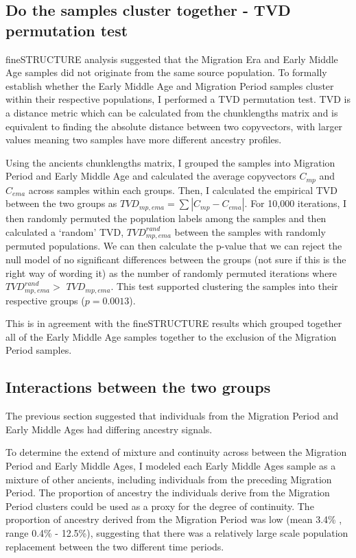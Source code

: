 \subsection{Do the samples cluster together - TVD permutation test}

fineSTRUCTURE analysis suggested that the Migration Era and Early Middle Age samples did not originate from the same source population. To formally establish whether the Early Middle Age and Migration Period samples cluster within their respective populations, I performed a TVD permutation test. TVD is a distance metric which can be calculated from the chunklengths matrix and is equivalent to finding the absolute distance between two copyvectors, with larger values meaning two samples have more different ancestry profiles.

Using the ancients chunklengths matrix, I grouped the samples into Migration Period and Early Middle Age and  calculated the average copyvectors $C_{mp}$ and $C_{ema}$ across samples within each groups. Then, I calculated the empirical TVD between the two groups as $TVD_{mp,ema} = \sum |C_{mp} - C_{ema}|$. For 10,000 iterations, I then randomly permuted the population labels among the samples and then calculated a `random' TVD, $TVD_{mp,ema}^{rand}$ between the samples with randomly permuted populations. We can then calculate the p-value that we can reject the null model of no significant differences between the groups (not sure if this is the right way of wording it) as the number of randomly permuted iterations where $TVD_{mp,ema}^{rand} > $ $TVD_{mp,ema}$. This test supported clustering the samples into their respective groups ($p=0.0013$).

This is in agreement with the fineSTRUCTURE results which grouped together all of the Early Middle Age samples together to the exclusion of the Migration Period samples. 

\subsection{Interactions between the two groups}

The previous section suggested that individuals from the Migration Period and Early Middle Ages had differing ancestry signals. 

To determine the extend of mixture and continuity across between the Migration Period and Early Middle Ages, I modeled each Early Middle Ages sample as a mixture of other ancients, including individuals from the preceding Migration Period. The proportion of ancestry the individuals derive from the Migration Period clusters could be used as a proxy for the degree of continuity. The proportion of ancestry derived from the Migration Period was low (mean 3.4\% , range 0.4\% - 12.5\%), suggesting that there was a relatively large scale population replacement between the two different time periods. 

